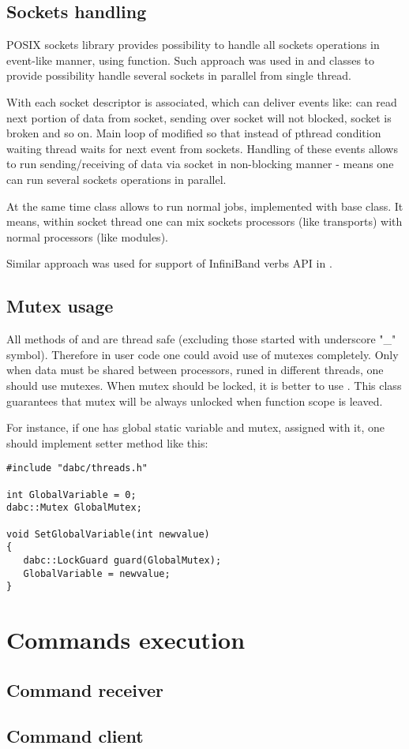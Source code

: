 \subsection{Sockets handling}

POSIX sockets library provides possibility to handle all sockets operations in 
event-like manner, using  function. Such approach was used in  
 and  classes to provide
possibility handle several sockets in parallel from single thread.

With each  socket descriptor is associated, which can
deliver events like: can read next portion of data from socket, 
sending over socket will not blocked, socket is broken and so on.
Main loop of  modified so that instead of pthread condition waiting 
thread waits for next event from sockets.
Handling of these events allows to run sending/receiving of data via socket 
in non-blocking manner - means one can run several sockets operations in parallel.  

At the same time  class allows to run normal jobs,
implemented with base  class. 
It means, within socket thread one can mix sockets processors (like transports) 
with normal processors (like modules).  

Similar approach was used for support of InfiniBand verbs API in \dabc. 


\subsection{Mutex usage}

All methods of  and  are thread
safe (excluding those started with underscore "\_" symbol). Therefore in
user code one could avoid use of mutexes completely. Only when data must be shared between
processors, runed in different threads, one should use mutexes. When mutex should be locked,
it is better to use . This class guarantees that mutex will be always unlocked
when function scope is leaved. 

For instance, if one has global static variable and mutex, assigned with it,
one should implement setter method like this:
\begin{small}
\begin{verbatim}
#include "dabc/threads.h"

int GlobalVariable = 0;
dabc::Mutex GlobalMutex;

void SetGlobalVariable(int newvalue) 
{
   dabc::LockGuard guard(GlobalMutex);
   GlobalVariable = newvalue;
}
\end{verbatim}     
\end{small}


\section{Commands execution}
\label{prog_services_commands}

\subsection{Command receiver}

\subsection{Command client}
